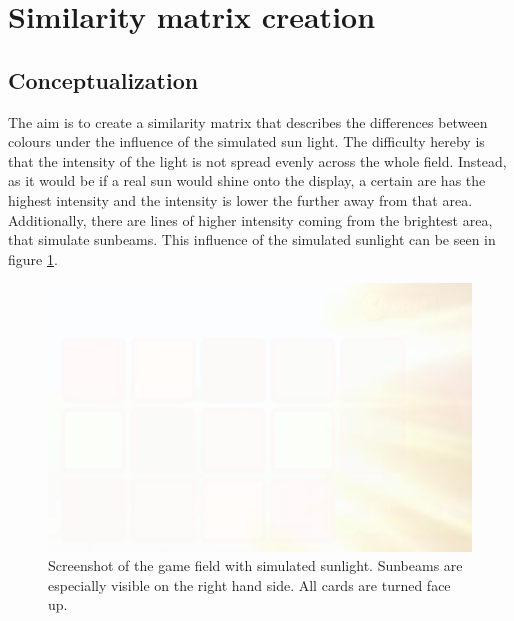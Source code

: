 \newpage

\section{Similarity matrix creation}
\label{similarity_matrix_cretion}

\subsection{Conceptualization}
\label{conceptualization}
The aim is to create a similarity matrix that describes the differences between colours under the influence of the simulated sun light. The difficulty hereby is that the intensity of the light is not spread evenly across the whole field. Instead, as it would be if a real sun would shine onto the display, a certain are has the highest intensity and the intensity is lower the further away from that area. Additionally, there are lines of higher intensity coming from the brightest area, that simulate sunbeams. This influence of the simulated sunlight can be seen in figure \ref{fig:glareEffect2}. 

\begin{figure}[H]
	\centering
	\includegraphics[width=14cm]{images/glareEffect.png}
	\caption[Screenshot of the game field with simulated sunlight.]{Screenshot of the game field with simulated sunlight. Sunbeams are especially visible on the right hand side. All cards are turned face up.}
	\label{fig:glareEffect2}
\end{figure}

